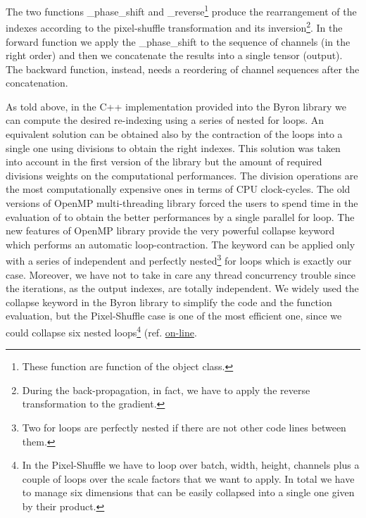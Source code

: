 \documentclass{standalone}
\begin{document}
The two functions \textsf{\_phase\_shift} and \textsf{\_reverse}\footnote{
  These function are  function of the object class.
}
produce the rearrangement of the indexes according to the pixel-shuffle transformation and its inversion\footnote{
  During the back-propagation, in fact, we have to apply the reverse transformation to the gradient.
}.
In the forward function we apply the \textsf{\_phase\_shift} to the sequence of channels (in the right order) and then we concatenate the results into a single tensor (output).
The backward function, instead, needs a reordering of channel sequences after the concatenation.

As told above, in the \textsf{C++} implementation provided into the \textsf{Byron} library we can compute the desired re-indexing using a series of nested for loops.
An equivalent solution can be obtained also by the contraction of the loops into a single one using divisions to obtain the right indexes.
This solution was taken into account in the first version of the library but the amount of required divisions weights on the computational performances.
The division operations are the most computationally expensive ones in terms of CPU clock-cycles.
The old versions of OpenMP multi-threading library forced the users to spend time in the evaluation of  to obtain the better performances by a single parallel for loop.
The new features of OpenMP library provide the very powerful \textsf{collapse} keyword which performs an automatic loop-contraction.
The keyword can be applied only with a series of independent and perfectly nested\footnote{
  Two for loops are perfectly nested if there are not other code lines between them.
}
for loops which is exactly our case.
Moreover, we have not to take in care any thread concurrency trouble since the iterations, as the output indexes, are totally independent.
We widely used the \textsf{collapse} keyword in the \textsf{Byron} library to simplify the code and the function evaluation, but the Pixel-Shuffle case is one of the most efficient one, since we could collapse six nested loops\footnote{
  In the Pixel-Shuffle we have to loop over batch, width, height, channels plus a couple of loops over the scale factors that we want to apply.
  In total we have to manage six dimensions that can be easily collapsed into a single one given by their product.
} (ref. \href{https://github.com/Nico-Curti/Byron/blob/master/src/shuffler_layer.cpp}{on-line}.
\end{document}
